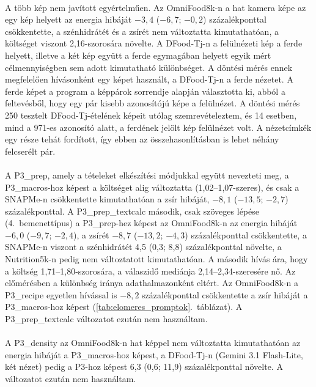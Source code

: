 \paragraph{}A több kép nem javított egyértelműen. Az OmniFood8k-n a hat kamera képe az egy kép 
helyett az energia hibáját $-3{,}4$ ($-6{,}7$; $-0{,}2$) százalékponttal csökkentette, a 
szénhidrátét és a zsírét nem változtatta kimutathatóan, a költséget viszont 2,16-szorosára növelte. 
A DFood-Tj-n a felülnézeti kép a ferde helyett, illetve a két kép együtt a ferde egymagában helyett 
egyik mért célmennyiségben sem adott kimutatható különbséget. A döntési mérés ennek megfelelően 
hívásonként egy képet használt, a DFood-Tj-n a ferde nézetet. A ferde képet a program a képpárok 
sorrendje alapján választotta ki, abból a feltevésből, hogy egy pár kisebb azonosítójú képe a 
felülnézet. A döntési mérés 250 tesztelt DFood-Tj-ételének képeit utólag szemrevételeztem, és 
14 esetben, mind a 971-es azonosító alatt, a ferdének jelölt kép felülnézet volt. A nézetcímkék 
egy része tehát fordított, így ebben az összehasonlításban is lehet néhány felcserélt pár.

\paragraph{}A P3\_prep, amely a tételeket elkészítési módjukkal együtt nevezteti meg, a 
P3\_macros-hoz képest a költséget alig változtatta (1,02--1,07-szeres), és csak a SNAPMe-n 
csökkentette kimutathatóan a zsír hibáját, $-8{,}1$ ($-13{,}5$; $-2{,}7$) százalékponttal. A 
P3\_prep\_textcalc második, csak szöveges lépése (4.~bemenettípus) a P3\_prep-hez képest az 
OmniFood8k-n az energia hibáját $-6{,}0$ ($-9{,}7$; $-2{,}4$), a zsírét $-8{,}7$ ($-13{,}2$; $-4{,}3$) 
százalékponttal csökkentette, a SNAPMe-n viszont a szénhidrátét 4,5 (0,3; 8,8) százalékponttal 
növelte, a Nutrition5k-n pedig nem változtatott kimutathatóan. A második hívás ára, hogy a költség 
1,71--1,80-szorosára, a válaszidő mediánja 2,14--2,34-szeresére nő. Az előmérésben a 
különbség iránya adathalmazonként eltért. Az OmniFood8k-n a P3\_recipe egyetlen hívással is $-8{,}2$ százalékponttal 
csökkentette a zsír hibáját a P3\_macros-hoz képest (\ref{tab:elomeres_promptok}.~táblázat). 
A P3\_prep\_textcalc változatot ezután nem használtam.

\paragraph{}A P3\_density az OmniFood8k-n hat képpel nem változtatta kimutathatóan az energia 
hibáját a P3\_macros-hoz képest, a DFood-Tj-n (Gemini 3.1 Flash-Lite, két nézet) pedig a P3-hoz 
képest 6,3 (0,6; 11,9) százalékponttal növelte. A változatot ezután nem használtam.

